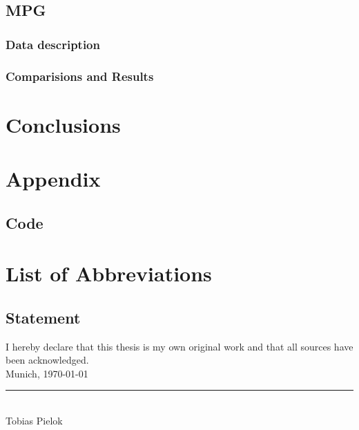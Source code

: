 \documentclass[12pt,letterpaper]{article}
\numberwithin{equation}{subsection}
\begin{document}
\subsection{MPG}
\subsubsection{Data description}
\subsubsection{Comparisions and Results}

\pagebreak

\section{Conclusions}
\pagebreak
\section{Appendix}
\subsection{Code}
\pagebreak

\pagestyle{fancy}

 

\nocite{*} 
\clearpage

\listoffigures
{}
\clearpage


\section*{List of Abbreviations}
\begin{multicols}{2}
  \begin{acronym}[abr]
  \end{acronym}
\end{multicols}



\pagebreak
\subsection*{Statement}
\label{erklaerung}
\vspace*{0.5cm}
I hereby declare that this thesis is my own original work and that all sources have been acknowledged.\\[1.0cm]
Munich, \today \\[2.0cm]
\rule{6.0cm}{0.4pt} \\
Tobias Pielok
\end{document}
